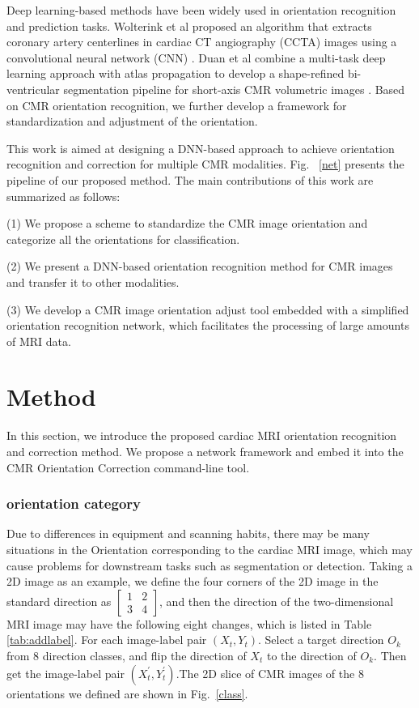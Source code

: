 \documentclass[runningheads]{llncs}
\begin{document}
Deep learning-based methods have been widely used in orientation recognition and prediction tasks. Wolterink et al proposed an algorithm that extracts coronary artery centerlines in cardiac CT angiography (CCTA) images using a convolutional neural network (CNN) \cite{8}. Duan et al combine a multi-task deep learning approach with atlas propagation to develop a shape-refined bi-ventricular segmentation pipeline for short-axis CMR volumetric images \cite{3}. Based on CMR orientation recognition, we further develop a framework for standardization and adjustment of the orientation.

This work is aimed at designing a DNN-based approach to achieve orientation recognition and correction for multiple CMR modalities. Fig. ~\ref{net} presents the pipeline of our proposed method. The main contributions of this work are summarized as follows:

(1) We propose a scheme to standardize the CMR image orientation and categorize all the orientations for classification.

(2) We present a DNN-based orientation recognition method for CMR images and transfer it to other modalities.

(3) We develop a CMR image orientation adjust tool embedded with a simplified orientation recognition network, which facilitates the processing of large amounts of MRI data.




\section{Method}

In this section, we introduce the proposed cardiac MRI orientation recognition and correction method. We propose a network framework and embed it into the CMR Orientation Correction command-line tool.

\subsubsection{orientation category}

Due to differences in equipment and scanning habits, there may be many situations in the Orientation corresponding to the cardiac MRI image, which may cause problems for downstream tasks such as segmentation or detection. Taking a 2D image as an example, we define the four corners of the 2D image in the standard direction as $\begin{bmatrix} 1 & 2 \\ 3 & 4 \end{bmatrix}$, and then the direction of the two-dimensional MRI image may have the following eight changes, which is listed in Table \ref{tab:addlabel}. For each image-label pair $(X_t, Y_t)$. Select a target direction $O_k$ from 8 direction classes, and flip the direction of $X_t$ to the direction of $O_k$. Then get the image-label pair $(X_t^{'}, Y_t^{'})$.The 2D slice of CMR images of the 8 orientations we defined are shown in Fig.~\ref{class}.
\end{document}
